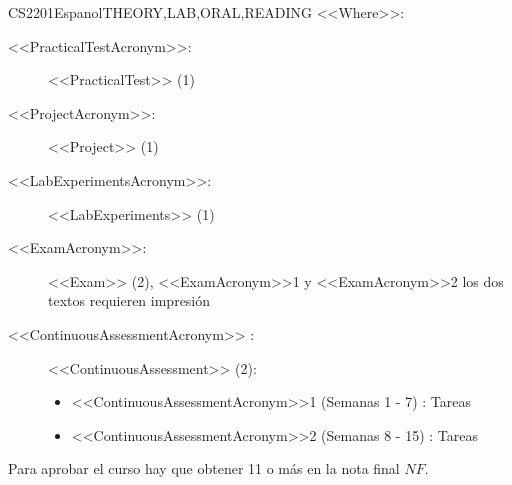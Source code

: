 \begin{evaluation}{CS2201}{Espanol}{THEORY,LAB,ORAL,READING}
  \vspace{2mm}
  \noindent <<Where>>:
  \begin{description}
    \item[<<PracticalTestAcronym>>:] <<PracticalTest>> (1)
    \item[<<ProjectAcronym>>:] <<Project>> (1)
    \item[<<LabExperimentsAcronym>>:] <<LabExperiments>> (1)
    \item[<<ExamAcronym>>:] <<Exam>> (2), <<ExamAcronym>>1 y <<ExamAcronym>>2  los dos textos requieren impresión
    \item[<<ContinuousAssessmentAcronym>> :] <<ContinuousAssessment>> (2):
    \begin{itemize}
       \item  <<ContinuousAssessmentAcronym>>1 (Semanas 1 - 7) : Tareas
       \item <<ContinuousAssessmentAcronym>>2 (Semanas 8 - 15) : Tareas
    \end{itemize}
  \end{description}

  \noindent Para aprobar el curso hay que obtener 11 o más en la nota final $NF$.
  \end{evaluation}

